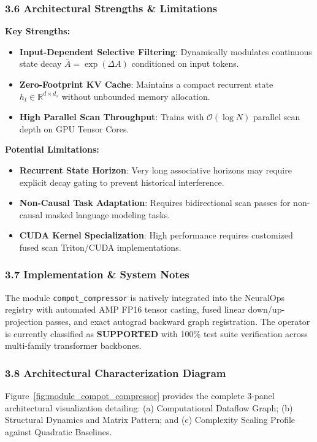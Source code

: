 \subsubsection*{3.6 Architectural Strengths \& Limitations}
\textbf{Key Strengths:}
\begin{itemize}
    \item \textbf{Input-Dependent Selective Filtering}: Dynamically modulates continuous state decay $\bar{A} = \exp(\Delta A)$ conditioned on input tokens.
    \item \textbf{Zero-Footprint KV Cache}: Maintains a compact recurrent state $h_t \in \mathbb{R}^{d \times d_s}$ without unbounded memory allocation.
    \item \textbf{High Parallel Scan Throughput}: Trains with $\mathcal{O}(\log N)$ parallel scan depth on GPU Tensor Cores.
\end{itemize}

\textbf{Potential Limitations:}
\begin{itemize}
    \item \textbf{Recurrent State Horizon}: Very long associative horizons may require explicit decay gating to prevent historical interference.
    \item \textbf{Non-Causal Task Adaptation}: Requires bidirectional scan passes for non-causal masked language modeling tasks.
    \item \textbf{CUDA Kernel Specialization}: High performance requires customized fused scan Triton/CUDA implementations.
\end{itemize}

\subsubsection*{3.7 Implementation \& System Notes}
The module \texttt{compot\_compressor} is natively integrated into the NeuralOps registry with automated AMP FP16 tensor casting, fused linear down/up-projection passes, and exact autograd backward graph registration. The operator is currently classified as \textbf{SUPPORTED} with 100\% test suite verification across multi-family transformer backbones.

\subsubsection*{3.8 Architectural Characterization Diagram}
Figure~\ref{fig:module_compot_compressor} provides the complete 3-panel architectural visualization detailing: (a) Computational Dataflow Graph; (b) Structural Dynamics and Matrix Pattern; and (c) Complexity Scaling Profile against Quadratic Baselines.

